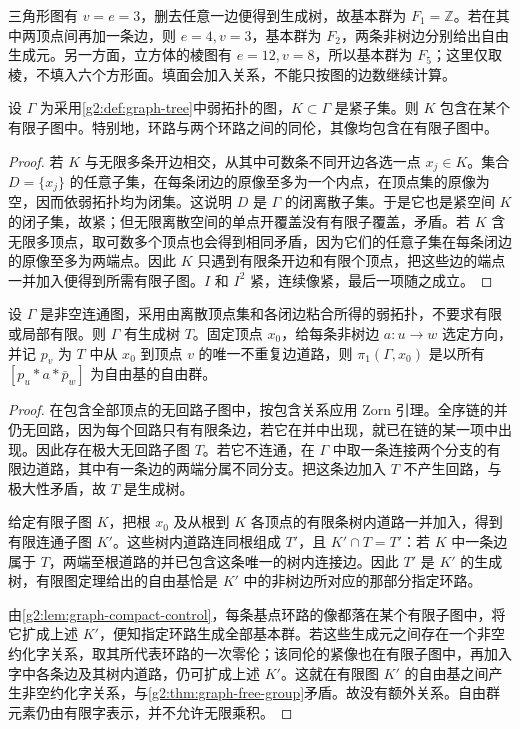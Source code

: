 \begin{example}\label{g2:exm:graph-computation}
	三角形图有 \(v=e=3\)，删去任意一边便得到生成树，故基本群为 \(F_1=\mathbb Z\)。若在其中两顶点间再加一条边，则 \(e=4,v=3\)，基本群为 \(F_2\)，两条非树边分别给出自由生成元。另一方面，立方体的棱图有 \(e=12,v=8\)，所以基本群为 \(F_5\)；这里仅取棱，不填入六个方形面。填面会加入关系，不能只按图的边数继续计算。
\end{example}

\begin{lemma}\label{g2:lem:graph-compact-control}
	设 \(\Gamma\) 为采用\cref{g2:def:graph-tree}中弱拓扑的图，\(K\subset\Gamma\) 是紧子集。则 \(K\) 包含在某个有限子图中。特别地，环路与两个环路之间的同伦，其像均包含在有限子图中。
\end{lemma}
\begin{proof}
	若 \(K\) 与无限多条开边相交，从其中可数条不同开边各选一点 \(x_j\in K\)。集合 \(D=\{x_j\}\) 的任意子集，在每条闭边的原像至多为一个内点，在顶点集的原像为空，因而依弱拓扑均为闭集。这说明 \(D\) 是 \(\Gamma\) 的闭离散子集。于是它也是紧空间 \(K\) 的闭子集，故紧；但无限离散空间的单点开覆盖没有有限子覆盖，矛盾。若 \(K\) 含无限多顶点，取可数多个顶点也会得到相同矛盾，因为它们的任意子集在每条闭边的原像至多为两端点。因此 \(K\) 只遇到有限条开边和有限个顶点，把这些边的端点一并加入便得到所需有限子图。\(I\) 和 \(I^2\) 紧，连续像紧，最后一项随之成立。
\end{proof}

\begin{proposition}\label{g2:prop:general-graph-free-group}
	设 \(\Gamma\) 是非空连通图，采用由离散顶点集和各闭边粘合所得的弱拓扑，不要求有限或局部有限。则 \(\Gamma\) 有生成树 \(T\)。固定顶点 \(x_0\)，给每条非树边 \(a:u\rightarrow w\) 选定方向，并记 \(p_v\) 为 \(T\) 中从 \(x_0\) 到顶点 \(v\) 的唯一不重复边道路，则 \(\pi_1(\Gamma,x_0)\) 是以所有 \([p_u*a*\bar p_w]\) 为自由基的自由群。
\end{proposition}
\begin{proof}
	在包含全部顶点的无回路子图中，按包含关系应用 Zorn 引理。全序链的并仍无回路，因为每个回路只有有限条边，若它在并中出现，就已在链的某一项中出现。因此存在极大无回路子图 \(T\)。若它不连通，在 \(\Gamma\) 中取一条连接两个分支的有限边道路，其中有一条边的两端分属不同分支。把这条边加入 \(T\) 不产生回路，与极大性矛盾，故 \(T\) 是生成树。

	给定有限子图 \(K\)，把根 \(x_0\) 及从根到 \(K\) 各顶点的有限条树内道路一并加入，得到有限连通子图 \(K'\)。这些树内道路连同根组成 \(T'\)，且 \(K'\cap T=T'\)：若 \(K\) 中一条边属于 \(T\)，两端至根道路的并已包含这条唯一的树内连接边。因此 \(T'\) 是 \(K'\) 的生成树，有限图定理给出的自由基恰是 \(K'\) 中的非树边所对应的那部分指定环路。

	由\cref{g2:lem:graph-compact-control}，每条基点环路的像都落在某个有限子图中，将它扩成上述 \(K'\)，便知指定环路生成全部基本群。若这些生成元之间存在一个非空约化字关系，取其所代表环路的一次零伦；该同伦的紧像也在有限子图中，再加入字中各条边及其树内道路，仍可扩成上述 \(K'\)。这就在有限图 \(K'\) 的自由基之间产生非空约化字关系，与\cref{g2:thm:graph-free-group}矛盾。故没有额外关系。自由群元素仍由有限字表示，并不允许无限乘积。
\end{proof}

